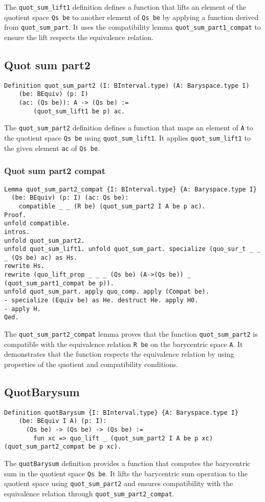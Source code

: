 \documentclass[a4paper,10pt]{article} %
\begin{document}
The \texttt{quot\_sum\_lift1} definition defines a function that lifts an element of the quotient space \texttt{Qs be} to another element of \texttt{Qs be} by applying a function derived from \texttt{quot\_sum\_part}. It uses the compatibility lemma \texttt{quot\_sum\_part1\_compat} to ensure the lift respects the equivalence relation.

\subsection{Quot sum part2}
\begin{lstlisting}
Definition quot_sum_part2 (I: BInterval.type) (A: Baryspace.type I) 
    (be: BEquiv) (p: I) 
    (ac: (Qs be)): A -> (Qs be) := 
        (quot_sum_lift1 be p) ac.
\end{lstlisting}
The \texttt{quot\_sum\_part2} definition defines a function that maps an element of \texttt{A} to the quotient space \texttt{Qs be} using \texttt{quot\_sum\_lift1}. It applies \texttt{quot\_sum\_lift1} to the given element \texttt{ac} of \texttt{Qs be}.

\subsubsection{Quot sum part2 compat}
\begin{lstlisting}
Lemma quot_sum_part2_compat {I: BInterval.type} {A: Baryspace.type I} 
  (be: BEquiv) (p: I) (ac: Qs be): 
    compatible _ _ (R be) (quot_sum_part2 I A be p ac). 
Proof.
unfold compatible.
intros. 
unfold quot_sum_part2. 
unfold quot_sum_lift1. unfold quot_sum_part. specialize (quo_sur_t _ _ _ (Qs be) ac) as Hs.
rewrite Hs. 
rewrite (quo_lift_prop _ _ _ (Qs be) (A->(Qs be)) _ (quot_sum_part1_compat be p)). 
unfold quot_sum_part. apply quo_comp. apply (Compat be). 
- specialize (Equiv be) as He. destruct He. apply H0.
- apply H.
Qed.
\end{lstlisting}
The \texttt{quot\_sum\_part2\_compat} lemma proves that the function \texttt{quot\_sum\_part2} is compatible with the equivalence relation \texttt{R be} on the barycentric space \texttt{A}. It demonstrates that the function respects the equivalence relation by using properties of the quotient and compatibility conditions.

\subsection{QuotBarysum}
\begin{lstlisting}
Definition quotBarysum {I: BInterval.type} {A: Baryspace.type I} 
    (be: BEquiv I A) (p: I): 
      (Qs be) -> (Qs be) -> (Qs be) := 
        fun xc => quo_lift _ (quot_sum_part2 I A be p xc) (quot_sum_part2_compat be p xc).
\end{lstlisting}
The \texttt{quotBarysum} definition provides a function that computes the barycentric sum in the quotient space \texttt{Qs be}. It lifts the barycentric sum operation to the quotient space using \texttt{quot\_sum\_part2} and ensures compatibility with the equivalence relation through \texttt{quot\_sum\_part2\_compat}.
\end{document}
